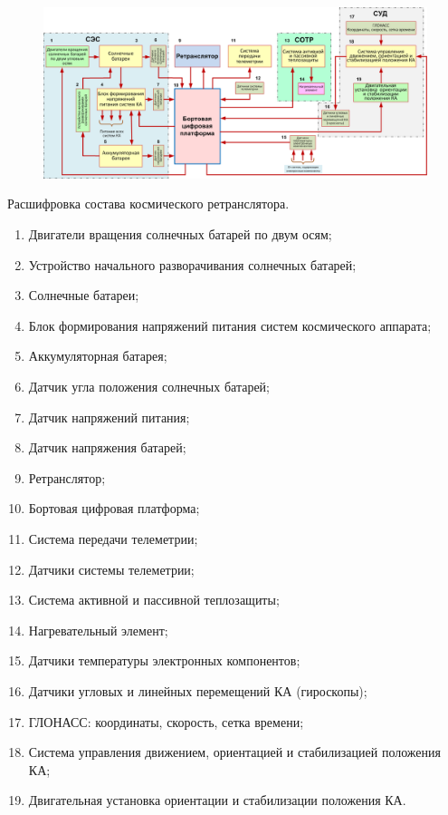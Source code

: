 \documentclass[14pt,a4paper,oneside]{extarticle}
\begin{document}
\begin{figure}[H]
    \begin{center}
        \includegraphics[width=\textwidth]{imgs/5}
    \end{center}
\end{figure}

Расшифровка состава космического ретранслятора.

\begin{enumerate}
    \item Двигатели вращения солнечных батарей по двум осям;
    \item Устройство начального разворачивания солнечных батарей;
    \item Солнечные батареи;
    \item Блок формирования напряжений питания систем космического аппарата;
    \item Аккумуляторная батарея;
    \item Датчик угла положения солнечных батарей;
    \item Датчик напряжений питания;
    \item Датчик напряжения батарей;
    \item Ретранслятор;
    \item Бортовая цифровая платформа;
    \item Система передачи телеметрии;
    \item Датчики системы телеметрии;
    \item Система активной и пассивной теплозащиты;
    \item Нагревательный элемент;
    \item Датчики температуры электронных компонентов;
    \item Датчики угловых и линейных перемещений КА (гироскопы);
    \item ГЛОНАСС: координаты, скорость, сетка времени;
    \item Система управления движением, ориентацией и стабилизацией положения КА;
    \item Двигательная установка ориентации и стабилизации положения КА.
\end{enumerate}
\end{document}
